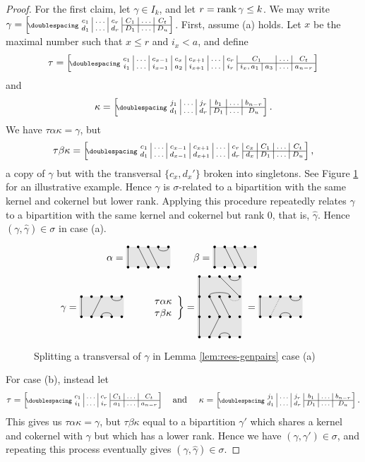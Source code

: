 \begin{lemma}
\begin{proof}
    For the first claim, let $\gamma \in I_k$, and let $r = \operatorname{rank}\gamma \leq k$.
    We may write $\gamma = \bipart{c|c|c|c|c|c}{4-6}
    {c_1 & \ldots & c_r & C_1 & \ldots & C_t}
    {d_1 & \ldots & d_r & D_1 & \ldots & D_u}$.
    First, assume (a) holds.
    Let $x$ be the maximal number such that $x \leq r$ and $i_x < a$, and define
    $$\tau = \bipart{c|c|c|c|c|c|c|c|c|c|c}{8-11}
    {c_1 & \ldots & c_{x-1} & c_x & c_{x+1} & \ldots & c_r
      & \mc2{c|}{C_1} & \ldots & C_t}
    {i_1 & \ldots & i_{x-1} & a_2 & i_{x+1} & \ldots & i_r
      & i_x, a_1 & a_3 & \ldots & a_{n-r}}$$
    and $$\kappa = \bipart{c|c|c|c|c|c}{4-6}
    {j_1 & \ldots & j_r & b_1 & \ldots & b_{n-r}}
    {d_1 & \ldots & d_r & D_1 & \ldots & D_u}.$$
    We have $\tau\alpha\kappa = \gamma$, but
    $$\tau\beta\kappa = \bipart{c|c|c|c|c|c|c|c|c|c}{7-10}
    {c_1 & \ldots & c_{x-1} & c_{x+1} & \ldots & c_r & c_x
      & C_1 & \ldots & C_t}
    {d_1 & \ldots & d_{x-1} & d_{x+1} & \ldots & d_r & d_x
      & D_1 & \ldots & D_u},$$
    a copy of $\gamma$ but with the transversal $\{c_x, d_x'\}$ broken into
    singletons.  See Figure \ref{fig:case-a-hat-example} for an illustrative
    example.  Hence $\gamma$ is $\sigma$-related to a bipartition with the same
    kernel and cokernel but lower rank.  Applying this procedure repeatedly
    relates $\gamma$ to a bipartition with the same kernel and cokernel but rank
    $0$, that is, $\widehat\gamma$.  Hence $(\gamma, \widehat\gamma) \in \sigma$
    in case (a).

    \begin{figure}[h]
      \centering
      $$
      \alpha = \bipartdiag{\tv11 \tv23 \tv34 \tc45} \qquad
      \beta = \bipartdiag{\tv11 \tv23 \tv34}
      $$
      $$
      \gamma = \bipartdiag{\tv11 \tc45 \bc34 \tv32} \qquad
      \left.
        \begin{array}{l}\tau\alpha\kappa\\ \tau\beta\kappa \end{array}
      \right\} = \triplebipartdiag{
        \uutv11\utv11\tv11
        \uutv35\uubc42\utv23\tv32
        \draw[densely dotted](5, 3.875) .. controls (5, 3.5) and (4, 3.5) .. (4, 3.875);
        \uutc45 \utv34 \bc34
      } = \bipartdiag{\tv11 \tc45 \bc34 \draw[densely dotted](3,2)--(2,0);}
      $$
      \caption{Splitting a transversal of $\gamma$ in Lemma
        \ref{lem:rees-genpairs} case (a)}
      \label{fig:case-a-hat-example}
    \end{figure}
    For case (b), instead let
    $$\tau = \bipart{c|c|c|c|c|c}{4-6}
    {c_1 & \ldots & c_r & C_1 & \ldots & C_t}
    {i_1 & \ldots & i_r & a_1 & \ldots & a_{n-r}} \text{\quad and \quad}
    \kappa = \bipart{c|c|c|c|c|c}{4-6}
    {j_1 & \ldots & j_r & b_1 & \ldots & b_{n-r}}
    {d_1 & \ldots & d_r & D_1 & \ldots & D_u}.$$
    This gives us $\tau\alpha\kappa = \gamma$, but $\tau\beta\kappa$ equal to a
    bipartition $\gamma'$ which shares a kernel and cokernel with $\gamma$ but
    which has a lower rank.  Hence we have $(\gamma, \gamma') \in \sigma$, and
    repeating this process eventually gives
    $(\gamma, \widehat\gamma) \in \sigma$.


\end{proof}
\end{lemma}
